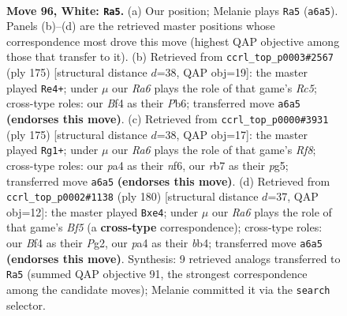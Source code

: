 \documentclass[11pt]{article}
\begin{document}
\clearpage

\begin{figure}[p]\centering
\begin{subfigure}{0.46\textwidth}\centering
\resizebox{\linewidth}{!}{%
\newchessgame
\chessboard[
  setfen={6k1/1r6/Rn3P1P/8/p4B2/P7/7K/8 w - - 1 96},
  showmover=false,
  pgfstyle=straightmove, color=movearrow, markmove={a6-a5}
]}
\caption{}
\end{subfigure}\hfill
\begin{subfigure}{0.46\textwidth}\centering
\resizebox{\linewidth}{!}{%
\newchessgame
\chessboard[
  setfen={8/8/1p1k4/1p6/1Nr4p/P6R/4K3/8 b - - 37 88},
  showmover=false,
  pgfstyle=straightmove, color=movearrow, markmove={c4-e4}
]}
\caption{}
\end{subfigure}
\\[4pt]
\begin{subfigure}{0.46\textwidth}\centering
\resizebox{\linewidth}{!}{%
\newchessgame
\chessboard[
  setfen={8/5p2/3k1Np1/6P1/6K1/5R2/8/5r2 b - - 41 88},
  showmover=false,
  pgfstyle=straightmove, color=movearrow, markmove={f1-g1}
]}
\caption{}
\end{subfigure}\hfill
\begin{subfigure}{0.46\textwidth}\centering
\resizebox{\linewidth}{!}{%
\newchessgame
\chessboard[
  setfen={8/8/1K6/p4B1k/Pb2r3/7P/6P1/8 w - - 0 91},
  showmover=false,
  pgfstyle=straightmove, color=movearrow, markmove={f5-e4}
]}
\caption{}
\end{subfigure}
\caption{\textbf{Move 96, White: \texttt{Ra5}.} (a) Our position; Melanie plays \texttt{Ra5} (\texttt{a6a5}). Panels (b)--(d) are the retrieved master positions whose correspondence most drove this move (highest QAP objective among those that transfer to it). (b) Retrieved from \texttt{ccrl\_top\_p0003\#2567} (ply 175) [structural distance $d$=38, QAP obj=19]: the master played \texttt{Re4+}; under $\mu$ our \emph{Ra6} plays the role of that game's \emph{Rc5}; cross-type roles: our \emph{B}f4 as their \emph{P}b6; transferred move \texttt{a6a5} \textbf{(endorses this move)}. (c) Retrieved from \texttt{ccrl\_top\_p0000\#3931} (ply 175) [structural distance $d$=38, QAP obj=17]: the master played \texttt{Rg1+}; under $\mu$ our \emph{Ra6} plays the role of that game's \emph{Rf8}; cross-type roles: our \emph{p}a4 as their \emph{n}f6, our \emph{r}b7 as their \emph{p}g5; transferred move \texttt{a6a5} \textbf{(endorses this move)}. (d) Retrieved from \texttt{ccrl\_top\_p0002\#1138} (ply 180) [structural distance $d$=37, QAP obj=12]: the master played \texttt{Bxe4}; under $\mu$ our \emph{Ra6} plays the role of that game's \emph{Bf5} (a \textbf{cross-type} correspondence); cross-type roles: our \emph{B}f4 as their \emph{P}g2, our \emph{p}a4 as their \emph{b}b4; transferred move \texttt{a6a5} \textbf{(endorses this move)}. Synthesis: 9 retrieved analogs transferred to \texttt{Ra5} (summed QAP objective 91, the strongest correspondence among the candidate moves); Melanie committed it via the \texttt{search} selector.}
\label{fig:thought-m190}
\end{figure}
\end{document}
